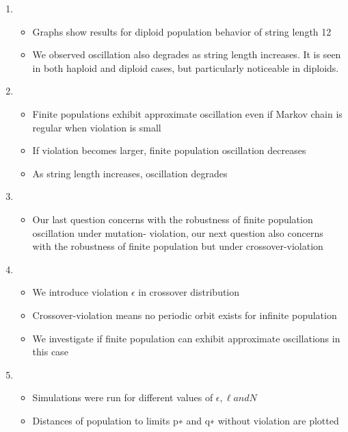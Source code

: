 \documentclass{article}
\begin{document}
\begin{enumerate}
\begin{itemize}
  \end{itemize}
  
\item
  \begin{itemize}
  \item Graphs show results for diploid population behavior of string length 12
  \item We observed oscillation also degrades as string length increases. 
  It is seen in both haploid and diploid cases, but particularly noticeable in diploids.  
  \end{itemize}
  
\item
  \begin{itemize}
  \item Finite populations exhibit approximate oscillation even if Markov chain is regular when violation is small
  \item If violation becomes larger, finite population oscillation decreases
  \item As string length increases, oscillation degrades
  \end{itemize}
  
\item
  \begin{itemize}
  \item Our last question concerns with the robustness of finite population oscillation under mutation- violation, 
  our next question also concerns with the robustness of finite population but under crossover-violation  
  \end{itemize}

\item
  \begin{itemize}
  \item We introduce violation $\epsilon$ in crossover distribution
  \item Crossover-violation means no periodic orbit exists for infinite population
  \item We investigate if finite population can exhibit approximate oscillations in this case     
  \end{itemize}
  
\item
  \begin{itemize}
  \item Simulations were run for different values of $\epsilon, \ell and N$
  \item Distances of population to limits p∗ and q∗ without violation are plotted  
  \end{itemize}
  

\end{enumerate}
\end{document}
